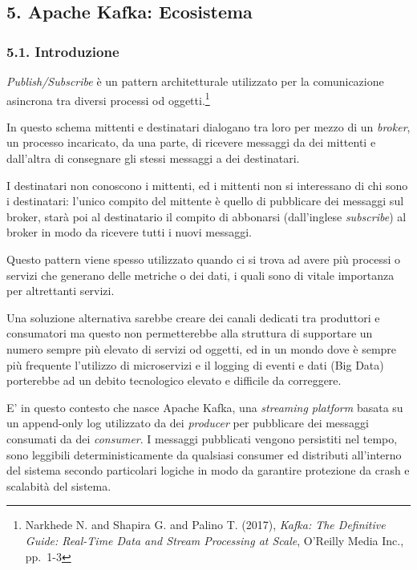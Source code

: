 \documentclass[]{article}
\begin{document}
\newpage

\subsection{5. Apache Kafka: Ecosistema}\label{apache-kafka-ecosistema}

\subsubsection{5.1. Introduzione}\label{introduzione-1}

\emph{Publish/Subscribe} è un pattern architetturale utilizzato per la
comunicazione asincrona tra diversi processi od oggetti.\footnote{Narkhede
  N. and Shapira G. and Palino T. (2017), \emph{Kafka: The Definitive
  Guide: Real-Time Data and Stream Processing at Scale}, O'Reilly Media
  Inc., pp.~1-3}

In questo schema mittenti e destinatari dialogano tra loro per mezzo di
un \emph{broker}, un processo incaricato, da una parte, di ricevere
messaggi da dei mittenti e dall'altra di consegnare gli stessi messaggi
a dei destinatari.

I destinatari non conoscono i mittenti, ed i mittenti non si interessano
di chi sono i destinatari: l'unico compito del mittente è quello di
pubblicare dei messaggi sul broker, starà poi al destinatario il compito
di abbonarsi (dall'inglese \emph{subscribe}) al broker in modo da
ricevere tutti i nuovi messaggi.

Questo pattern viene spesso utilizzato quando ci si trova ad avere più
processi o servizi che generano delle metriche o dei dati, i quali sono
di vitale importanza per altrettanti servizi.

Una soluzione alternativa sarebbe creare dei canali dedicati tra
produttori e consumatori ma questo non permetterebbe alla struttura di
supportare un numero sempre più elevato di servizi od oggetti, ed in un
mondo dove è sempre più frequente l'utilizzo di microservizi e il
logging di eventi e dati (Big Data) porterebbe ad un debito tecnologico
elevato e difficile da correggere.

E' in questo contesto che nasce Apache Kafka, una \emph{streaming
platform} basata su un append-only log utilizzato da dei \emph{producer}
per pubblicare dei messaggi consumati da dei \emph{consumer}. I messaggi
pubblicati vengono persistiti nel tempo, sono leggibili
deterministicamente da qualsiasi consumer ed distributi all'interno del
sistema secondo particolari logiche in modo da garantire protezione da
crash e scalabità del sistema.
\end{document}
